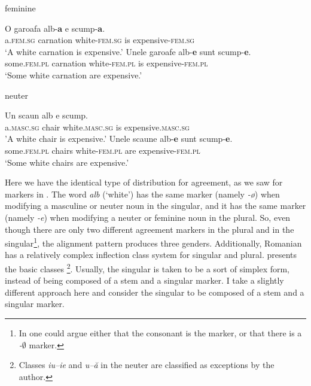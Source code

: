     \begin{exe}
    \ex feminine
    \begin{xlist}
        \ex 
        \gll O garoafa alb-\textbf{a} e scump-\textbf{a}.\\
        a.\textsc{fem.sg} carnation white-\textsc{fem.sg} is expensive-\textsc{fem.sg}\\
        \glt `A white carnation is expensive.'
        \ex 
        \gll Unele garoafe alb-\textbf{e} sunt scump-\textbf{e}.\\
        some.\textsc{fem.pl} carnation white-\textsc{fem.pl} is expensive-\textsc{fem.pl}\\
        \glt `Some white carnation are expensive.'
    \end{xlist}

    \ex \label{romanian-neut-exe} neuter
    \begin{xlist}
        \ex 
        \gll Un scaun alb e scump.\\
        a.\textsc{masc.sg} chair white.\textsc{masc.sg} is expensive.\textsc{masc.sg}\\
        \glt 'A white chair is expensive.'
        \ex 
        \gll Unele scaune alb-\textbf{e} sunt scump-\textbf{e}.\\
        some.\textsc{fem.pl} chairs white-\textsc{fem.pl} are expensive-\textsc{fem.pl}\\
        \glt `Some white chairs are expensive.'
    \end{xlist}
\end{exe}

Here we have the identical type of distribution for agreement, as we saw for markers in . The word \textit{alb} (`white') has the same marker (namely \textit{-ø}) when modifying a masculine or neuter noun in the singular, and it has the same marker (namely \textit{-e}) when modifying a neuter or feminine noun in the plural. So, even though there are only two different agreement markers in the plural and in the singular\footnote{In  one could argue either that the consonant is the marker, or that there is a \textit{-$\emptyset$} marker.}, the alignment pattern produces three genders. Additionally, Romanian has a relatively complex inflection class system for singular and plural.  presents the basic classes \autocite{Cojocaru.2003}\footnote{Classes \textit{iu--ie} and \textit{u--ă} in the neuter are classified as exceptions by the author.}. Usually, the singular is taken to be a sort of simplex form, instead of being composed of a stem and a singular marker. I take a slightly different approach here and consider the singular to be composed of a stem and a singular marker.

